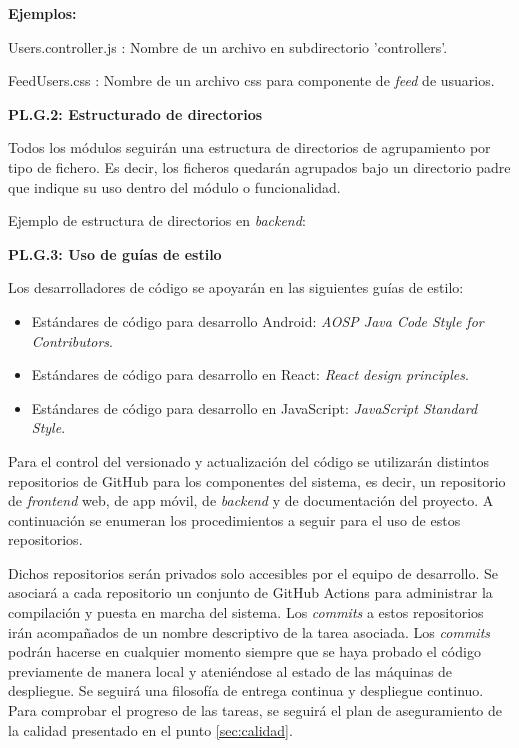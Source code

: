 \documentclass{article}
\begin{document}
\textbf{Ejemplos:} 

Users.controller.js : Nombre de un archivo en subdirectorio 'controllers'.

FeedUsers.css :  Nombre de un archivo css para componente de \textit{feed} de usuarios.

\pagebreak
\textbf{PL.G.2: Estructurado de directorios}

Todos los módulos seguirán una estructura de directorios de agrupamiento por tipo de fichero. Es decir, los ficheros quedarán agrupados bajo un directorio padre que indique su uso dentro del módulo o funcionalidad.

Ejemplo de estructura de directorios en \textit{backend}:


\textbf{PL.G.3: Uso de guías de estilo}

Los desarrolladores de código se apoyarán en las siguientes guías de estilo:

\begin{itemize}
    \setlength{\itemsep}{0em}
    \item Estándares de código para desarrollo Android: \textit{AOSP Java Code Style for Contributors}.
    \item Estándares de código para desarrollo en React: \textit{React design principles}.
    \item Estándares de código para desarrollo en JavaScript: \textit{JavaScript Standard Style}.
\end{itemize}

Para el control del versionado y actualización del código se utilizarán distintos repositorios de GitHub para los componentes del sistema, es decir, un repositorio de \textit{frontend} web, de app móvil, de \textit{backend} y de documentación del proyecto. A continuación se enumeran los procedimientos a seguir para el uso de estos repositorios.

Dichos repositorios serán privados solo accesibles por el equipo de desarrollo. Se asociará a cada repositorio un conjunto de GitHub Actions para administrar la compilación y puesta en marcha del sistema. Los \textit{commits} a estos repositorios irán acompañados de un nombre descriptivo de la tarea asociada. Los \textit{commits} podrán hacerse en cualquier momento siempre que se haya probado el código previamente de manera local y ateniéndose al estado de las máquinas de despliegue. Se seguirá una filosofía de entrega continua y despliegue continuo. Para comprobar el progreso de las tareas, se seguirá el plan de aseguramiento de la calidad presentado en el punto \ref{sec:calidad}.
\end{document}
